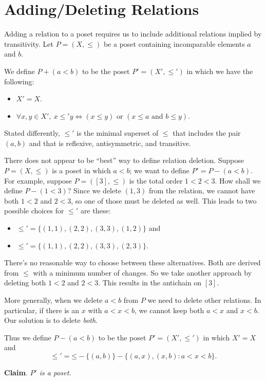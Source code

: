 \documentclass[12pt]{amsart}
\begin{document}
\section*{Adding/Deleting Relations}

Adding a relation to a poset requires us to include additional
relations implied by transitivity. Let $P=(X,\le)$ be a poset
containing incomparable elements $a$ and $b$.

We define $P+(a<b)$ to be the poset $P' = (X',\le')$ in which we have
the following:
\begin{itemize}
\item $X' = X$.
\item $\forall x,y \in X', \ x \le' y \iff (x \le y) \text{ or } 
  (x \le a \text{ and } b \le y)$.
\end{itemize}
Stated differently, $\le'$ is the minimal superset of $\le$ that
includes the pair $(a,b)$ and that is reflexive, antisymmetric, and
transitive. 

There does not appear to be ``best'' way to define relation
deletion. Suppose $P=(X,\le)$ is a poset in which $a<b$; we want to
define $P' = P-(a<b)$.  For example, suppose $P=([3],\le)$ is the
total order $1<2<3$. How shall we define $P-(1<3)$? Since we delete
$(1,3)$ from the relation, we cannot have both $1<2$ and $2<3$, so one
of those must be deleted as well.  This leads to two possible choices
for $\le'$ are these:
\begin{itemize}
\item $\mathord{\le'} = \{(1,1),(2,2),(3,3), (1,2) \}$ and
\item $\mathord{\le'} = \{(1,1),(2,2),(3,3), (2,3) \}$.
\end{itemize}
There's no reasonable way to choose between these alternatives. Both
are derived from $\le$ with a minimum number of changes. So we take
another approach by deleting both $1<2$ and $2<3$. This results in the
antichain on $[3]$. 

More generally, when we delete $a<b$ from $P$ we need to delete other
relations. In particular, if there is an $x$ with $a<x<b$, we cannot
keep both $a<x$ and $x<b$. Our solution is to delete \emph{both}. 

Thus we define $P-(a<b)$ to be the poset $P' = (X',\le')$ in which 
$X'=X$ and
\[
\mathord{\le'} = \mathord{\le} 
- \bigl\{ (a,b) \bigr\}
- \bigl\{(a,x),(x,b) : a<x<b \bigr\} .
\]

\noindent\textbf{Claim}. \emph{$P'$ is a poset.}
\end{document}
